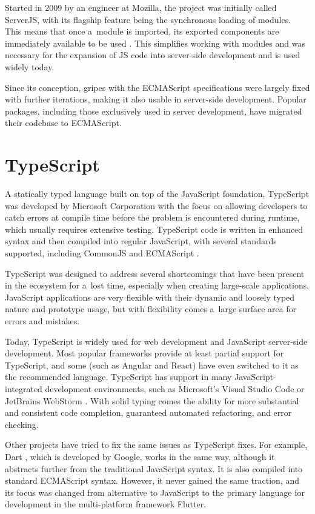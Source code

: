 Started in 2009 by an engineer at Mozilla, the project was initially called
ServerJS, with its flagship feature being the synchronous loading of modules.
This means that once a~module is imported, its exported components are
immediately available to be used \cite{commonjs-introduction}. This simplifies
working with modules and was necessary for the expansion of JS code into
server-side development and is used widely today. 

Since its conception, gripes with the ECMAScript specifications were largely
fixed with further iterations, making it also usable in server-side development.
Popular packages, including those exclusively used in server development, have
migrated their codebase to ECMAScript.


\section*{TypeScript}
A statically typed language built on top of the JavaScript foundation,
TypeScript was developed by Microsoft Corporation with the focus on allowing
developers to catch errors at compile time before the problem is encountered
during runtime, which usually requires extensive testing. TypeScript code is
written in enhanced syntax and then compiled into regular JavaScript, with
several standards supported, including CommonJS and ECMAScript
\cite{typescript-modules}.

TypeScript was designed to address several shortcomings that have been present
in the ecosystem for a~lost time, especially when creating large-scale
applications. JavaScript applications are very flexible with their dynamic and
loosely typed nature and prototype usage, but with flexibility comes a~large
surface area for errors and mistakes. 

Today, TypeScript is widely used for web development and JavaScript server-side
development. Most popular frameworks provide at least partial support for
TypeScript, and some (such as Angular and React) have even switched to it as the
recommended language. TypeScript has support in many JavaScript-integrated
development environments, such as Microsoft's Visual Studio Code
\cite{typescript-vscode} or JetBrains WebStorm \cite{typescript-webstorm}. With
solid typing comes the ability for more substantial and consistent code
completion, guaranteed automated refactoring, and error checking.

Other projects have tried to fix the same issues as TypeScript fixes. For
example, Dart \cite{dart-homepage}, which is developed by Google, works in the
same way, although it abstracts further from the traditional JavaScript syntax.
It is also compiled into standard ECMAScript syntax. However, it never gained
the same traction, and its focus was changed from alternative to JavaScript to
the primary language for development in the multi-platform framework Flutter.


